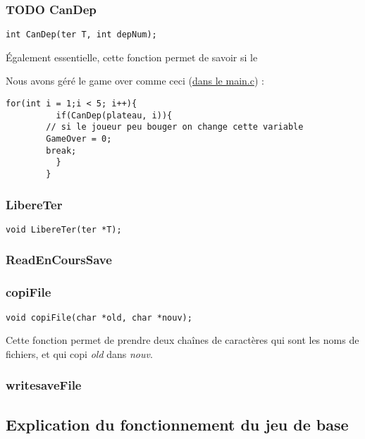 \documentclass[letter]{article}
\begin{document}
\subsubsection{{\bfseries\sffamily TODO} CanDep}
\label{sec:org42dfd89}

\begin{verbatim}
int CanDep(ter T, int depNum);
\end{verbatim}



Également essentielle, cette fonction permet de savoir si le

Nous avons géré le game over comme ceci (\href{main.c}{dans le main.c}) :
\begin{verbatim}
for(int i = 1;i < 5; i++){
	      if(CanDep(plateau, i)){
		// si le joueur peu bouger on change cette variable
		GameOver = 0;
		break;
	      }
	    }
\end{verbatim}


\subsubsection{LibereTer}
\label{sec:org202c82b}

\begin{verbatim}
void LibereTer(ter *T);
\end{verbatim}

\subsubsection{ReadEnCoursSave}
\label{sec:orge8f4271}



\subsubsection{copiFile}
\label{sec:org8b1382e}

\begin{verbatim}
void copiFile(char *old, char *nouv);
\end{verbatim}

Cette fonction permet de prendre deux chaînes de caractères qui sont les noms de fichiers, et qui copi \emph{old} dans \emph{nouv}.

\subsubsection{writesaveFile}
\label{sec:org92a1e2b}

\subsection{Explication du fonctionnement du jeu de base}
\label{sec:org9c76c47}
\end{document}
